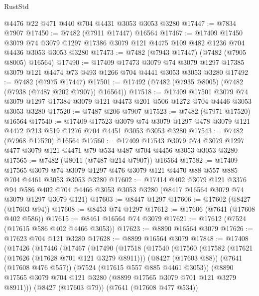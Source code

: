 \begin{lexlean}{RustStd}
\begin{coremodule}
{\begin{coremodule}
{{{{{{{{{{{{{{{{{{{{{{{{{{{{{{{{    @4476
    @22
    @471
    @440
    @704
    @4431
    @3053
    @3053
    @3280
@17447 := @7834 @7907
@17450 := @7482 (@7911 @17447) @16564
@17467 := @17409
    @17450
    @3079
    @74
    @3079
    @1297
    @17386
    @3079
    @121
    @4475
    @109
    @482
    @1236
    @704
    @4436
    @3053
    @3053
    @3280
@17473 := @7482 (@7943 @17447) (@7482 (@7905 @8005) @16564)
@17490 := @17409
    @17473
    @3079
    @74
    @3079
    @1297
    @17385
    @3079
    @121
    @4474
    @73
    @493
    @1266
    @704
    @4441
    @3053
    @3053
    @3280
@17492 := @7482 (@7975 @17447)
@17501 := @17492 (@7482 (@7935 @8005) (@7482 (@7938 (@7487 @202 @7907)) @16564))
@17518 := @17409
    @17501
    @3079
    @74
    @3079
    @1297
    @17384
    @3079
    @121
    @4473
    @201
    @506
    @1272
    @704
    @4446
    @3053
    @3053
    @3280
@17520 := @7487 @206 @7907
@17523 := @7482 (@7971 @17520) @16564
@17540 := @17409
    @17523
    @3079
    @74
    @3079
    @1297
    @478
    @3079
    @121
    @4472
    @213
    @519
    @1276
    @704
    @4451
    @3053
    @3053
    @3280
@17543 := @7482 (@7968 @17520) @16564
@17560 := @17409
    @17543
    @3079
    @74
    @3079
    @1297
    @477
    @3079
    @121
    @4471
    @79
    @534
    @487
    @704
    @4456
    @3053
    @3053
    @3280
@17565 := @7482 (@8011 (@7487 @214 @7907)) @16564
@17582 := @17409
    @17565
    @3079
    @74
    @3079
    @1297
    @476
    @3079
    @121
    @4470
    @88
    @557
    @885
    @704
    @4461
    @3053
    @3053
    @3280
@17602 := @17414
    @402
    @3079
    @121
    @3376
    @94
    @586
    @402
    @704
    @4466
    @3053
    @3053
    @3280
    (@8417 @16564 @3079 @74 @3079 @1297 @3079 @121)
@17603 := @8447 @1297
@17606 := @17602 (@8427 (@17603 @94))
@17608 := @8453 @74 @1297
@17612 := @17606 (@7641 (@17608 @402 @586))
@17615 := @8461 @16564 @74 @3079
@17621 := @17612 (@7524 (@17615 @586 @402 @4466 @3053))
@17623 := @8890 @16564 @3079
@17626 := @17623 @704 @121 @3280
@17628 := @8899 @16564 @3079
@17848 := @17408
    (@17426
      (@17446
        (@17467
          (@17490
            (@17518
              (@17540
                (@17560
                  (@17582
                    (@17621 (@17626 (@17628 @701 @121 @3279 @8911)))
                    (@8427 (@17603 @88))
                    (@7641 (@17608 @476 @557))
                    (@7524 (@17615 @557 @885 @4461 @3053))
                    (@8890 @17565 @3079 @704 @121 @3280 (@8899 @17565 @3079 @701 @121 @3279 @8911)))
                  (@8427 (@17603 @79))
                  (@7641 (@17608 @477 @534))
}}}}}}}}}}}}}}}}}}}}}}}}}}}}}}}}
\end{coremodule}}
\end{coremodule}
\end{lexlean}
